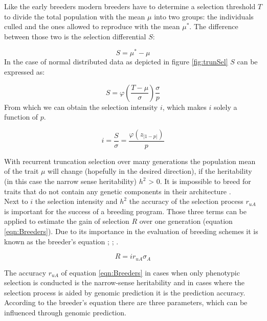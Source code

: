 Like the early breeders modern breeders have to determine a selection threshold $T$ to divide the
total population with the mean $\mu$ into two groups: the individuals culled and the ones allowed to
reproduce with the mean $\mu^{\ast}$. The difference between those two is the selection differential
$S$:

\begin{equation}
 S = \mu^{\ast} - \mu
\label{eqn:S}
\end{equation}
\noindent
In the case of normal distributed data as depicted in figure \ref{fig:trunSel} $S$ can be expressed as:

\begin{equation}
S = \varphi (\frac{T - \mu}{\sigma}) \frac{\sigma}{p}
\end{equation}
\noindent
From which we can obtain the selection intensity $i$, which makes $i$ solely a function of $p$.

\begin{equation}
i = \frac{S}{\sigma} = \frac{\varphi (z_{|1-p|})}{p}
\end{equation}

With recurrent truncation selection over many generations the population mean of the trait
$\mu$ will change (hopefully in the desired direction), if the heritability (in this case
the narrow sense heritability) $h^2$ > 0. It is impossible to breed for traits that do not
contain any genetic components in their architecture \cite{walsh2018}.\\
Next to $i$ the selection intensity and $h^2$ the accuracy of the selection process
$r_{uA}$ is important for the success of a breeding program. Those three terms can be
applied to estimate the gain of selection $R$ over one generation (equation
\ref{eqn:Breeders}). Due to its importance in the evaluation of breeding schemes it is
known as the breeder's equation \cite{mousseau1987natural}; \cite{falconer1996};
\cite{kingsolver2001strength}.

\begin{equation}
 R = i r_{uA} \sigma_A
\label{eqn:Breeders}
\end{equation}

The accuracy $r_{uA}$ of equation \ref{eqn:Breeders} in cases when only phenotypic
selection is conducted is the narrow-sense heritability and in cases where the selection
process is aided by genomic prediction it is the prediction accuracy. According to the
breeder's equation there are three parameters, which can be influenced through genomic
prediction. \\

